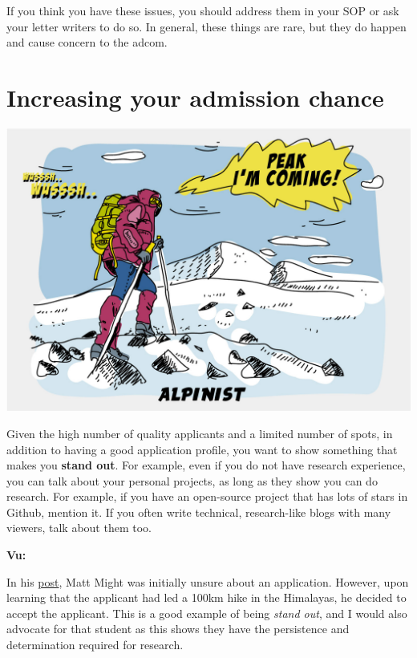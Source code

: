 \documentclass[oneside,11pt,dvipsnames]{book}
\newenvironment{commentbox}[1][]{
  \small
  \begin{mybox}
    {\small \textbf{#1}}
  }{
  \end{mybox}
}
\newcommand{\subsectioninfo}[1]{%
  \phantomsection
  \addcontentsline{toc}{subsectioninfo}{\textcolor{black}{\texttt #1}}%
}
\begin{document}
If you think you have these issues, you should address them in your SOP or ask your letter writers to do so.
In general, these things are rare, but they do happen and cause concern to the adcom.





\section{Increasing your admission chance}\label{sec:improve-your-chance}
\subsectioninfo{You can improve your profile by being unique and standing out.}

\begin{center}
  \includegraphics[scale=0.2]{files/alpinist-climbing-peak-mountain-comic-hand-drawn-vector-illustration.jpg}
\end{center}


Given the high number of quality applicants and a limited number of spots, in addition to having a good application profile, you want to show something that makes you \textbf{stand out}.  For example, even if you do not have research experience, you can talk about your personal projects, as long as they show you can do research. For example, if you have an open-source project that has lots of stars in Github, mention it. If you often write technical, research-like blogs with many viewers, talk about them too.


\begin{commentbox}[Vu:]
In his \href{https://matt.might.net/articles/how-to-apply-and-get-in-to-graduate-school-in-science-mathematics-engineering-or-computer-science/}{post}, Matt Might was initially unsure about an application. However, upon learning that the applicant had led a 100km hike in the Himalayas, he decided to accept the applicant.  This is a good example of being \emph{stand out}, and I would also advocate for that student as this shows they have the persistence and determination required for research.
\end{commentbox}
\end{document}

